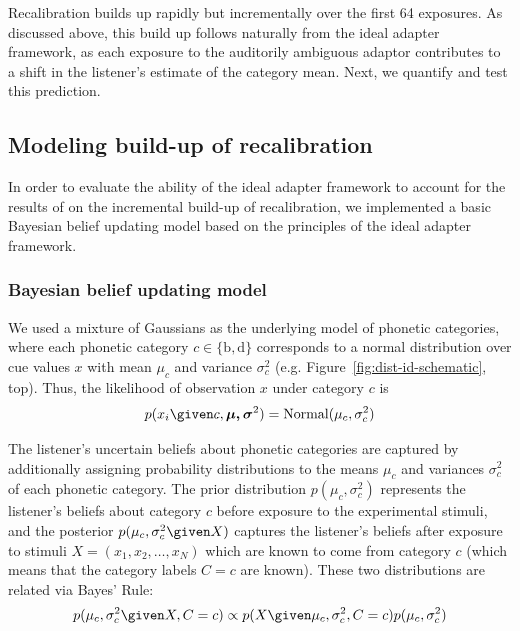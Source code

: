 Recalibration builds up rapidly but incrementally over the first 64 exposures.  As discussed above, this build up follows naturally from the ideal adapter framework, as each exposure to the auditorily ambiguous adaptor contributes to a shift in the listener's estimate of the category mean.
Next, we quantify and test this prediction.


\subsection{Modeling build-up of recalibration}
\label{sec:modeling-build-up}

In order to evaluate the ability of the ideal adapter framework to account for the results of  on the incremental build-up of recalibration, we implemented a basic Bayesian belief updating model based on the principles of the ideal adapter framework.

\subsubsection{Bayesian belief updating model}
\label{sec:bayes-beli-updat}

We used a mixture of Gaussians as the underlying model of phonetic categories, where each phonetic category $c \in \{\mathrm b, \mathrm d\}$ corresponds to a normal distribution over cue values $x$ with mean $\mu_c$ and variance $\sigma^2_c$ (e.g. Figure~\ref{fig:dist-id-schematic}, top).  Thus, the likelihood of observation $x$ under category $c$ is
\begin{equation}
  \label{eq:4}
  p(x_i \given c, \boldsymbol{\mu, \sigma}^2) = \mathrm{Normal} (\mu_{c}, \sigma^2_{c})
\end{equation}

The listener's uncertain beliefs about phonetic categories are captured by additionally assigning probability distributions to the means $\mu_c$ and variances $\sigma^2_c$ of each phonetic category.  The prior distribution $p(\mu_c, \sigma^2_c)$ represents the listener's beliefs about category $c$ before exposure to the experimental stimuli, and the posterior $p(\mu_c, \sigma^2_c \given X)$ captures the listener's beliefs after exposure to stimuli $X = (x_1, x_2, \ldots, x_N)$ which are known to come from category $c$ (which means that the category labels $C=c$ are known).  These two distributions are related via Bayes' Rule:
\begin{equation}
  \label{eq:5}
  p(\mu_c, \sigma^2_c \given X, C=c) \propto p(X\given \mu_c, \sigma^2_c, C=c) p(\mu_c, \sigma^2_c)
\end{equation}

